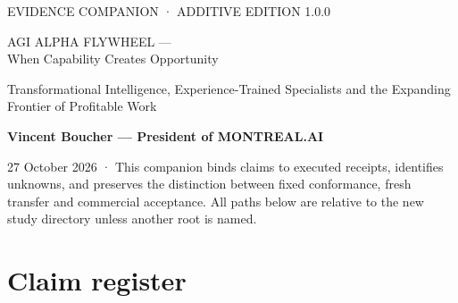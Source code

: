 \documentclass[10 pt]{article}
\begin{document}
\thispagestyle{empty}
{\sffamily\small\color{teal}EVIDENCE COMPANION · ADDITIVE EDITION 1.0.0\par}
\vspace{5 mm}
{\sffamily\bfseries\color{navy}\fontsize{23}{28}\selectfont\raggedright AGI ALPHA FLYWHEEL —\\When Capability Creates Opportunity\par}
\vspace{4 mm}
{\sffamily\large Transformational Intelligence, Experience-Trained Specialists and the Expanding Frontier of Profitable Work\par}
\vspace{4 mm}
\textbf{Vincent Boucher — President of MONTREAL.AI}

27 October 2026 · This companion binds claims to executed receipts, identifies unknowns, and preserves the distinction between fixed conformance, fresh transfer and commercial acceptance. All paths below are relative to the new study directory unless another root is named.

\section{Claim register}
\end{document}
